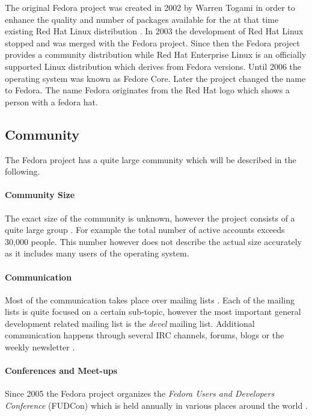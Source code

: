 The original Fedora project was created in 2002 by Warren Togami in order to
enhance the quality and number of packages available for the at that time
existing Red Hat Linux distribution
\cite{FedoraAbout,FedoraTogami,FedoraHistoricalSchedules}. In 2003 the
development of Red Hat Linux stopped and was merged with the Fedora project.
Since then the Fedora project provides a community distribution while Red Hat
Enterprise Linux is an officially supported Linux distribution which derives
from Fedora versions. Until 2006 the operating system was known as Fedore Core.
Later the project changed the name to Fedora. The name Fedora originates from
the Red Hat logo which shows a person with a fedora hat.

\subsection{Community}

The Fedora project has a quite large community which will be described in the
following.

\paragraph{Community Size}

The exact size of the community is unknown, however the project consists of a
quite large group \cite{FedoraStatistics}. For example the total number of
active accounts exceeds 30,000 people. This number however does not describe
the actual size accurately as it includes many users of the operating system.

\paragraph{Communication}

Most of the communication takes place over mailing lists
\cite{FedoraAbout,FedoraJoin,FedoraSIG}. Each of the mailing lists is quite
focused on a certain sub-topic, however the most important general development
related mailing list is the \emph{devel} mailing list. Additional communication
happens through several \ac{IRC} channels, forums, blogs or the weekly
newsletter \cite{FedoraFWN,FedoraCommunicating}.

\paragraph{Conferences and Meet-ups}

Since 2005 the Fedora project organizes the \emph{Fedora Users and Developers
Conference} (FUDCon) which is held annually in various places around the world
\cite{FedoraFUDCon}.

